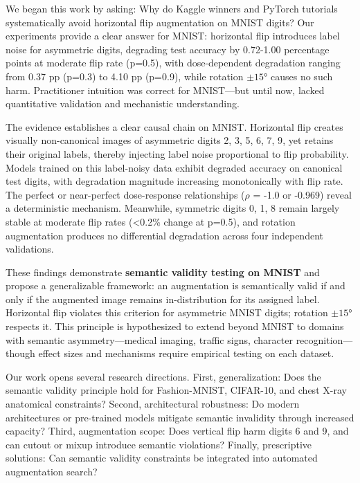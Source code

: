 
We began this work by asking: Why do Kaggle winners and PyTorch tutorials systematically avoid horizontal flip augmentation on MNIST digits? Our experiments provide a clear answer for MNIST: horizontal flip introduces label noise for asymmetric digits, degrading test accuracy by 0.72-1.00 percentage points at moderate flip rate (p=0.5), with dose-dependent degradation ranging from 0.37 pp (p=0.3) to 4.10 pp (p=0.9), while rotation $\pm 15$° causes no such harm. Practitioner intuition was correct for MNIST---but until now, lacked quantitative validation and mechanistic understanding.

The evidence establishes a clear causal chain on MNIST. Horizontal flip creates visually non-canonical images of asymmetric digits {2, 3, 5, 6, 7, 9}, yet retains their original labels, thereby injecting label noise proportional to flip probability. Models trained on this label-noisy data exhibit degraded accuracy on canonical test digits, with degradation magnitude increasing monotonically with flip rate. The perfect or near-perfect dose-response relationships ($\rho$ = -1.0 or -0.969) reveal a deterministic mechanism. Meanwhile, symmetric digits {0, 1, 8} remain largely stable at moderate flip rates (<0.2\% change at p=0.5), and rotation augmentation produces no differential degradation across four independent validations.

These findings demonstrate \textbf{semantic validity testing on MNIST} and propose a generalizable framework: an augmentation is semantically valid if and only if the augmented image remains in-distribution for its assigned label. Horizontal flip violates this criterion for asymmetric MNIST digits; rotation $\pm 15$° respects it. This principle is hypothesized to extend beyond MNIST to domains with semantic asymmetry---medical imaging, traffic signs, character recognition---though effect sizes and mechanisms require empirical testing on each dataset.

Our work opens several research directions. First, generalization: Does the semantic validity principle hold for Fashion-MNIST, CIFAR-10, and chest X-ray anatomical constraints? Second, architectural robustness: Do modern architectures or pre-trained models mitigate semantic invalidity through increased capacity? Third, augmentation scope: Does vertical flip harm digits 6 and 9, and can cutout or mixup introduce semantic violations? Finally, prescriptive solutions: Can semantic validity constraints be integrated into automated augmentation search?

